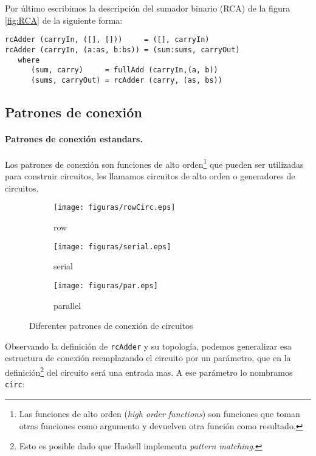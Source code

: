 Por último escribimos la descripción del sumador binario (RCA) de la figura \ref{fig:RCA} de la siguiente forma:

\begin{lstlisting}
rcAdder (carryIn, ([], []))     = ([], carryIn)
rcAdder (carryIn, (a:as, b:bs)) = (sum:sums, carryOut)
   where
      (sum, carry)     = fullAdd (carryIn,(a, b))
      (sums, carryOut) = rcAdder (carry, (as, bs))
\end{lstlisting}

\subsection{Patrones de conexión}
\paragraph{Patrones de conexión estandars.} Los patrones de conexión son funciones de alto orden\footnote{Las funciones de alto orden (\emph{high order functions}) son funciones que toman otras funciones como argumento y devuelven otra función como resultado.} que pueden ser utilizadas para construir circuitos, les llamamos circuitos de alto orden o generadores de circuitos.

\begin{figure}[h]
  \centering
\hspace{-23pt}
\begin{subfigure}[b]{0.45\textwidth}
                \centering
                \texttt{[image: figuras/rowCirc.eps]}
                \caption{row}
                \label{fig:rowcirc}
        \end{subfigure}
\begin{subfigure}[b]{0.25\textwidth}
                \centering
                \texttt{[image: figuras/serial.eps]}
                \caption{serial}
                \label{fig:serial}
        \end{subfigure}
\begin{subfigure}[b]{0.30\textwidth}
                \centering
                \texttt{[image: figuras/par.eps]}
                \caption{parallel}
                \label{fig:parallel}
        \end{subfigure}
  \caption{Diferentes patrones de conexión de circuitos}\label{fig:pattern}
\end{figure}


Observando la definición de {\footnotesize\verb|rcAdder|} y su topología, podemos generalizar esa estructura de conexión reemplazando el circuito por un parámetro, que en la definición\footnote{Esto es posible dado que Haskell implementa \emph{pattern matching}.} del circuito será una entrada mas. A ese parámetro lo nombramos {\footnotesize\verb|circ|}:


